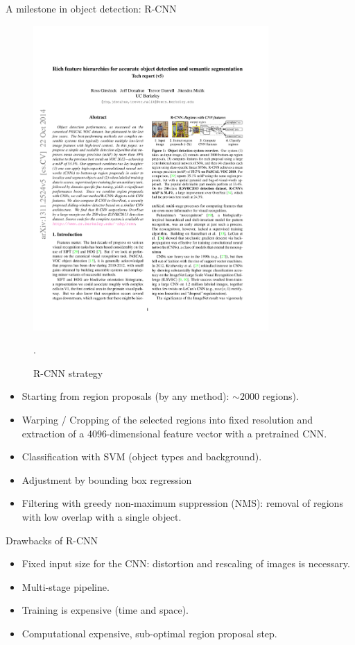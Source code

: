 \documentclass[xcolor=pdftex,dvipsnames,table]{beamer}
\begin{document}
\begin{frame}{A milestone in object detection: R-CNN}
\begin{figure}[htb]
   \centering
   \includegraphics[width=0.8\textwidth]{../graphics/R-CNN.pdf}
   \caption{R-CNN strategy \cite{Girshick2014}}.
\end{figure}
\begin{itemize}
	\item Starting from region proposals (by any method): $\sim 2000$ regions). 
	\item Warping / Cropping of the selected regions into fixed resolution and extraction of a 4096-dimensional feature vector with a pretrained CNN. 
	\item Classification with SVM (object types and background). 
	\item Adjustment by bounding box regression
	\item Filtering with greedy non-maximum suppression (NMS): removal of regions with low overlap with a single object. 
\end{itemize}
\end{frame}

\begin{frame}{Drawbacks of R-CNN}
\begin{itemize}
\item Fixed input size for the CNN: distortion and rescaling of images is necessary.
\item Multi-stage pipeline.
\item Training is expensive (time and space).
\item Computational expensive, sub-optimal region proposal step.
\end{itemize} 
\end{frame}
\end{document}
